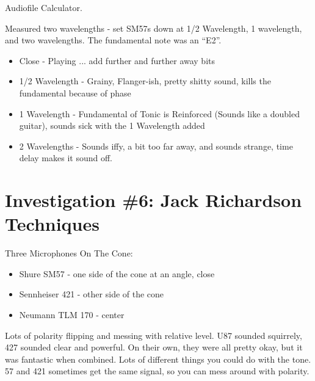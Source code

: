 \documentclass{article}
\begin{document}
Audiofile Calculator.

\medskip

Measured two wavelengths - set SM57s down at 1/2 Wavelength, 1 wavelength, and two wavelengths. The fundamental note was an ``E2''.

\begin{itemize}
\item Close - Playing ... add further and further away bits 
\item 1/2 Wavelength - Grainy, Flanger-ish, pretty shitty sound, kills the fundamental because of phase 
\item 1 Wavelength - Fundamental of Tonic is Reinforced (Sounds like a doubled guitar), sounds sick with the 1 Wavelength added 
\item 2 Wavelengths - Sounds iffy, a bit too far away, and sounds strange, time delay makes it sound off.
\end{itemize}

\section{Investigation \#6: Jack Richardson Techniques}

Three Microphones On The Cone:

\begin{itemize}
\item Shure SM57 - one side of the cone at an angle, close
\item Sennheiser 421 - other side of the cone 
\item Neumann TLM 170 - center
\end{itemize}

Lots of polarity flipping and messing with relative level. U87 sounded squirrely, 427 sounded clear and powerful. On their own, they were all pretty okay, but it was fantastic when combined. Lots of different things you could do with the tone. 57 and 421 sometimes get the same signal, so you can mess around with polarity. 
\end{document}

